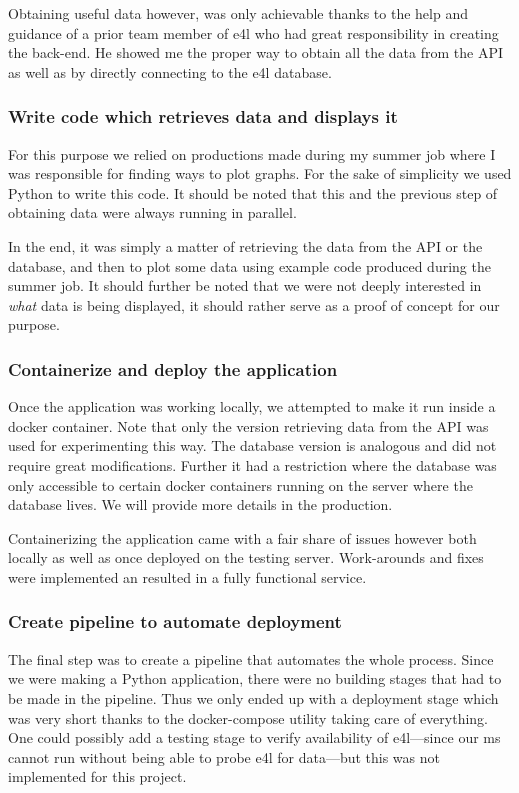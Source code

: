 Obtaining useful data however, was only achievable thanks to the help
and guidance of a prior team member of \gls{e4l} who had great
responsibility in creating the back-end. He showed me the proper way to
obtain all the data from the API as well as by directly connecting to
the \gls{e4l} database.

\subsubsection{Write code which retrieves data and displays it}

For this purpose we relied on productions made during my summer job
where I was responsible for finding ways to plot graphs. For the sake
of simplicity we used Python to write this code. It should be noted
that this and the previous step of obtaining data were always running
in parallel.

In the end, it was simply a matter of retrieving the data from the API
or the database, and then to plot some data using example code
produced during the summer job. It should further be noted that we
were not deeply interested in \textit{what} data is being displayed, it should
rather serve as a proof of concept for our purpose.

\subsubsection{Containerize and deploy the application}

Once the application was working locally, we attempted to make it run
inside a docker container. Note that only the version retrieving data
from the API was used for experimenting this way. The database version
is analogous and did not require great modifications. Further it had a
restriction where the database was only accessible to certain docker
containers running on the server where the database lives. We will
provide more details in the production.

Containerizing the application came with a fair share of issues
however both locally as well as once deployed on the testing server.
Work-arounds and fixes were implemented an resulted in a fully
functional service.

\subsubsection{Create pipeline to automate deployment}

The final step was to create a pipeline that automates the whole
process. Since we were making a Python application, there were no
building stages that had to be made in the pipeline. Thus we only
ended up with a deployment stage which was very short thanks to the
docker-compose utility taking care of everything. One could possibly
add a testing stage to verify availability of \gls{e4l}---since our
\gls{ms} cannot run without being able to probe \gls{e4l} for
data---but this was not implemented for this project.

